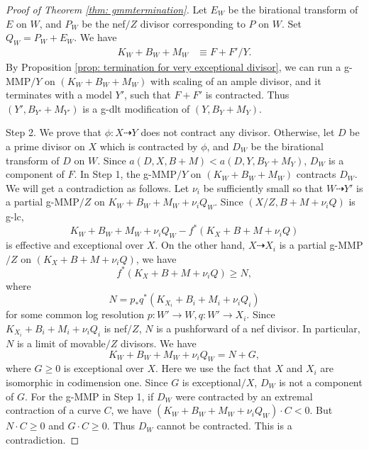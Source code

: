 \documentclass[11pt]{amsart}
\begin{document}
\begin{proof}[Proof of Theorem \ref{thm: gmmtermination}]
	Let $E_W$ be the birational transform of $E$ on $W$, and $P_W$ be the nef$/Z$ divisor corresponding to $P$ on $W$. Set $Q_W=P_W+E_W$. We have
	\begin{equation}\label{eq: W}
	\begin{split}
	K_W+B_W+M_W &\equiv F+F'/Y.
	\end{split}
	\end{equation}  
	By Proposition \ref{prop: termination for very exceptional divisor}, we can run a g-MMP$/Y$ on $(K_W+B_W+M_W)$ with scaling of an ample divisor, and it terminates with a model $Y'$, such that $F+F'$ is contracted. Thus $(Y',B_{Y'}+M_{Y'})$ is a g-dlt modification of $(Y, B_Y+M_Y)$. 
	
	
Step 2. We prove that $\phi: X\dashrightarrow Y$ does not contract any divisor. Otherwise, let $D$ be a prime divisor on $X$ which is contracted by $\phi$, and $D_W$ be the birational transform of $D$ on $W$. Since $a(D,X,B+M)<a(D,Y,B_Y+M_Y)$, $D_W$ is a component of $F$. In Step 1, the g-MMP$/Y$ on $(K_W+B_W+M_W)$ contracts $D_W$. We will get a contradiction as follows. Let $\nu_i$ be sufficiently small so that $W\dashrightarrow Y'$ is a partial g-MMP$/Z$ on $K_W+B_W+M_W+\nu_i Q_W$. Since $(X/Z,B+M+\nu_iQ)$ is g-lc, 
	$$K_W+B_W+M_W+\nu_i Q_W-f^{*}(K_X+B+M+\nu_i Q)$$
	is effective and exceptional over $X$. On the other hand, $X\dashrightarrow X_i$ is a partial g-MMP$/Z$ on $(K_X+B+M+\nu_i Q)$, we have $$f^{*}(K_X+B+M+\nu_i Q)\ge N,$$ 
	where 
	\[
	N=p_{*}q^{*}(K_{X_{i}}+B_i+M_i+\nu_i Q_i)
	\]
	for some common log resolution $p:W'\to W, q:W'\to X_i$. Since $K_{X_{i}}+B_i+M_i+\nu_i Q_i$ is nef$/Z$, $N$ is a pushforward of a nef divisor. In particular, $N$ is a limit of movable$/Z$ divisors. We have
	\[
	K_W+B_W+M_W+\nu_i Q_W=N+G,
	\]
	where $G \geq 0$ is exceptional over $X$. Here we use the fact that $X$ and $X_i$ are isomorphic in codimension one. Since $G$ is exceptional$/X$, $D_W$ is not a component of $G$. For the g-MMP in Step 1, if $D_W$ were contracted by an extremal contraction of a curve $C$, we have $(K_W+B_W+M_W+\nu_i Q_W) \cdot C<0$. But $N \cdot C \geq0$ and $G \cdot C\geq 0$. Thus $D_W$ cannot be contracted. This is a contradiction.
	

\end{proof}
\end{document}
